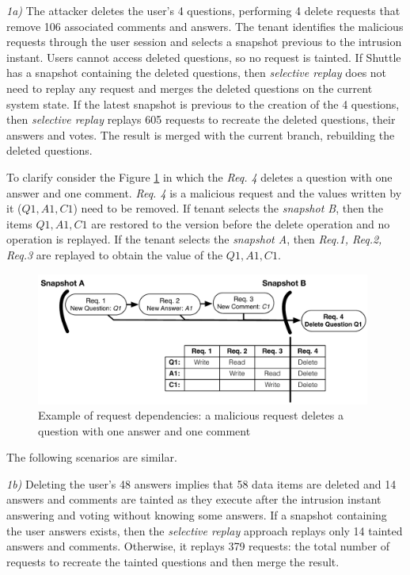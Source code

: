 \textit{1a)} 
The attacker deletes the user's 4 questions, performing 4 delete requests that remove 106 associated comments and answers. 
The tenant identifies the malicious requests through the user session and selects a snapshot previous to the intrusion instant. Users cannot access deleted questions, so no request is tainted. 
If Shuttle has a snapshot containing the deleted questions, then \textit{selective replay} does not need to replay any request and merges the deleted questions on the current system state. If the latest snapshot is previous to the creation of the 4 questions, then \textit{selective replay} replays 605 requests to recreate the deleted questions, their answers and votes. The result is merged with the current branch, rebuilding the deleted questions. 

To clarify consider the Figure \ref{fig:attack_1_graph} in which the \emph{Req. 4} deletes a question with one answer and one comment. \emph{Req. 4} is a malicious request and the values written by it ($Q1, A1, C1$) need to be removed. If tenant selects the \emph{snapshot B}, then the items $Q1, A1, C1$ are restored to the version before the delete operation and no operation is replayed. If the tenant selects the \emph{snapshot A}, then \emph{Req.1, Req.2, Req.3} are replayed to obtain the value of the $Q1, A1, C1$. 

\begin{figure}
  \centering
  \includegraphics[width=110mm]{images/attack_1_graph}
  \caption[Example of request dependencies]{Example of request dependencies: a malicious request deletes a question with one answer and one comment}
  \label{fig:attack_1_graph}
\end{figure}

The following scenarios are similar.

\textit{1b)} Deleting the user's 48 answers implies that 58 data items are deleted and 14 answers and comments are tainted as they execute after the intrusion instant answering and voting without knowing some answers. If a snapshot containing the user answers exists, then the \textit{selective replay} approach replays only 14 tainted answers and comments. Otherwise, it replays 379 requests: the total number of requests to recreate the tainted questions and then merge the result.

